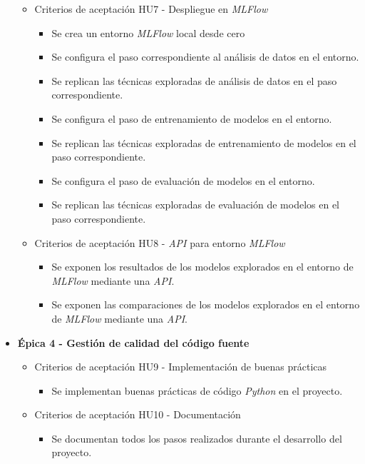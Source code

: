 \documentclass[
11pt, %
]{charter}
\begin{document}
\begin{itemize}
\begin{itemize}
      \item Criterios de aceptación HU7 - Despliegue en \textit{MLFlow}
        \begin{itemize}
            \item Se crea un entorno \textit{MLFlow} local desde cero
            \item Se configura el paso correspondiente al análisis de datos en el entorno.
            \item Se replican las técnicas exploradas de análisis de datos en el paso correspondiente.
            \item Se configura el paso de entrenamiento de modelos en el entorno.
            \item Se replican las técnicas exploradas de entrenamiento  de modelos en el paso correspondiente.
            \item Se configura el paso de evaluación de modelos en el entorno.
            \item Se replican las técnicas exploradas de evaluación de modelos en el paso correspondiente.
        \end{itemize}
      \item Criterios de aceptación HU8 - \textit{API} para entorno \textit{MLFlow}
        \begin{itemize}
            \item Se exponen los resultados de los modelos explorados en el entorno de \textit{MLFlow} mediante una \textit{API}.
            \item Se exponen las comparaciones de los modelos explorados en el entorno de \textit{MLFlow} mediante una \textit{API}.
        \end{itemize}
    \end{itemize}
  \item \textbf{\'{E}pica 4 - Gestión de calidad del código fuente}
    \begin{itemize}
      \item Criterios de aceptación HU9 - Implementación de buenas prácticas
        \begin{itemize}
            \item Se implementan buenas prácticas de código \textit{Python} en el proyecto.
        \end{itemize}
      \item Criterios de aceptación HU10 - Documentación
        \begin{itemize}
            \item Se documentan todos los pasos realizados durante el desarrollo del proyecto.

\end{itemize}
\end{itemize}
\end{itemize}
\end{document}
